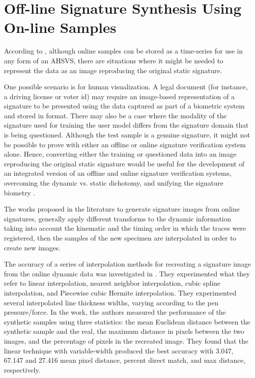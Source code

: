 \section{Off-line Signature Synthesis Using On-line Samples}

According to \cite{guest2013assessment}, although online samples can be stored as a time-series for use in any form of an AHSVS, there are situations where it might be needed to represent the data as an image reproducing the original static signature. 
 
One possible scenario is for human visualization. A legal document (for instance, a driving license or voter id) may require an image-based representation of a signature to be presented using the data captured as part of a biometric system and stored in format. There may also be a case where the modality of the signature used for training the user model differs from the signature domain that is being questioned. Although the test sample is a genuine signature, it might not be possible to prove with either an offline or online signature verification system alone. Hence, converting either the training or questioned data into an image reproducing the original static signature would be useful for the development of an integrated version of an offline and online signature verification systems, overcoming the dynamic vs. static dichotomy, and unifying the signature biometry \cite{chapter}.

The works proposed in the literature to generate signature images from online signatures, generally apply different transforms to the dynamic information taking into account the kinematic and the timing order in which the traces were registered, then the samples of the new specimen are interpolated in order to create new images. 

The accuracy of a series of interpolation methods for recreating a signature image from the online dynamic data was investigated in  \cite{guest2013assessment}. They experimented what they refer to linear interpolation, nearest neighbor interpolation, cubic spline interpolation, and Piecewise cubic Hermite interpolation. They experimented several interpolated line thickness widths, varying according to the pen pressure/force. In the work, the authors measured the performance of the synthetic samples using three statistics: the mean Euclidean distance between the synthetic sample and the real, the maximum distance in pixels between the two images, and the percentage of pixels in the recreated image. They found that the linear technique with variable-width produced the best accuracy with 3.047, 67.147 and 27.416 mean pixel distance, percent direct match, and max distance, respectively.

